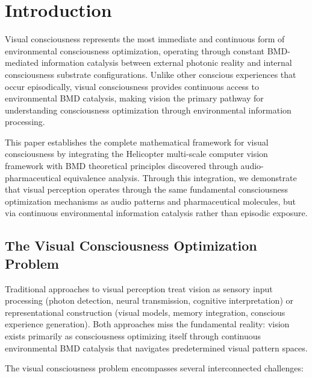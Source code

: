 \documentclass[12pt,a4paper]{article}
\begin{document}
\section{Introduction}

Visual consciousness represents the most immediate and continuous form of environmental consciousness optimization, operating through constant BMD-mediated information catalysis between external photonic reality and internal consciousness substrate configurations. Unlike other conscious experiences that occur episodically, visual consciousness provides continuous access to environmental BMD catalysis, making vision the primary pathway for understanding consciousness optimization through environmental information processing.

This paper establishes the complete mathematical framework for visual consciousness by integrating the Helicopter multi-scale computer vision framework with BMD theoretical principles discovered through audio-pharmaceutical equivalence analysis. Through this integration, we demonstrate that visual perception operates through the same fundamental consciousness optimization mechanisms as audio patterns and pharmaceutical molecules, but via continuous environmental information catalysis rather than episodic exposure.

\subsection{The Visual Consciousness Optimization Problem}

Traditional approaches to visual perception treat vision as sensory input processing (photon detection, neural transmission, cognitive interpretation) or representational construction (visual models, memory integration, conscious experience generation). Both approaches miss the fundamental reality: vision exists primarily as consciousness optimizing itself through continuous environmental BMD catalysis that navigates predetermined visual pattern spaces.

The visual consciousness problem encompasses several interconnected challenges:
\end{document}
